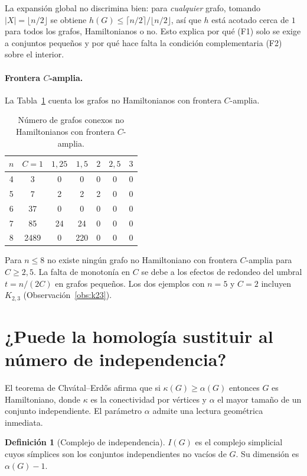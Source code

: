 \documentclass[11pt,a4paper]{article}
\theoremstyle{definition}
\newtheorem{definicion}[teorema]{Definición}
\theoremstyle{remark}
\begin{document}
La expansión global no discrimina bien: para \emph{cualquier} grafo, tomando $|X|=\lfloor n/2\rfloor$ se obtiene $h(G)\le\lceil n/2\rceil/\lfloor n/2\rfloor$, así que $h$ está acotado cerca de $1$ para todos los grafos, Hamiltonianos o no. Esto explica por qué (F1) solo se exige a conjuntos pequeños y por qué hace falta la condición complementaria (F2) sobre el interior.

\paragraph{Frontera $C$-amplia.} La Tabla~\ref{tab:C} cuenta los grafos no Hamiltonianos con frontera $C$-amplia.

\begin{table}[h]
\centering
\begin{tabular}{ccccccc}
\toprule
$n$ & $C=1$ & $1{,}25$ & $1{,}5$ & $2$ & $2{,}5$ & $3$\\
\midrule
4 & 3 & 0 & 0 & 0 & 0 & 0\\
5 & 7 & 2 & 2 & 2 & 0 & 0\\
6 & 37 & 0 & 0 & 0 & 0 & 0\\
7 & 85 & 24 & 24 & 0 & 0 & 0\\
8 & 2489 & 0 & 220 & 0 & 0 & 0\\
\bottomrule
\end{tabular}
\caption{Número de grafos conexos no Hamiltonianos con frontera $C$-amplia.}\label{tab:C}
\end{table}

Para $n\le8$ no existe ningún grafo no Hamiltoniano con frontera $C$-amplia para $C\ge2{,}5$. La falta de monotonía en $C$ se debe a los efectos de redondeo del umbral $t=n/(2C)$ en grafos pequeños. Los dos ejemplos con $n=5$ y $C=2$ incluyen $K_{2,3}$ (Observación~\ref{obs:k23}).


\section{¿Puede la homología sustituir al número de independencia?}\label{sec:homologia}

El teorema de Chvátal--Erdős \cite{chvatalerdos} afirma que si $\kappa(G)\ge\alpha(G)$ entonces $G$ es Hamiltoniano, donde $\kappa$ es la conectividad por vértices y $\alpha$ el mayor tamaño de un conjunto independiente. El parámetro $\alpha$ admite una lectura geométrica inmediata.

\begin{definicion}[Complejo de independencia]
$I(G)$ es el complejo simplicial cuyos símplices son los conjuntos independientes no vacíos de $G$. Su dimensión es $\alpha(G)-1$.
\end{definicion}
\end{document}

